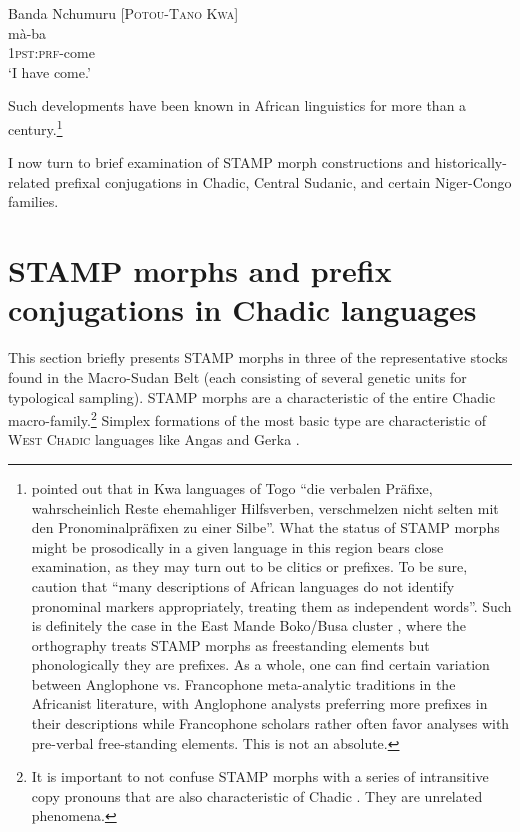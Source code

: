 \documentclass[output=paper]{langsci/langscibook}
\begin{document}
\ea\label{ex:anderson:40}
Banda Nchumuru \citep[Nuchumuru 4]{Cleal1973}      [\textsc{Potou-Tano} K\textsc{wa}]\\
\gll mà-ba\\
\textsc{1pst}:\textsc{prf}-come\\
\glt `I have come.'
\z

Such developments have been known in African linguistics for more than a century.\footnote{\citet[211]{Seidel1898} pointed out that in Kwa languages of Togo ``die verbalen Präfixe, wahrscheinlich Reste ehemahliger Hilfsverben, verschmelzen nicht selten mit den Pronominalpräfixen zu einer Silbe''. What the status of STAMP morphs might be prosodically in a given language in this region bears close examination, as they may turn out to be clitics or prefixes. To be sure, \citet[93]{CreisselsEtAl2008} caution that ``many descriptions of African languages do not identify pronominal markers appropriately, treating them as independent words''. Such is definitely the case in the East Mande Boko/Busa cluster \citep{Jones1998}, where the orthography treats STAMP morphs as freestanding elements but phonologically they are prefixes. As a whole, one can find certain variation between Anglophone vs. Francophone meta-analytic traditions in the Africanist literature, with Anglophone analysts preferring more prefixes in their descriptions while Francophone scholars rather often favor analyses with pre-verbal free-standing elements. This is not an absolute.} 

I now turn to brief examination of STAMP morph constructions and historically-related prefixal conjugations in Chadic, Central Sudanic, and certain Niger-Congo families.

\section{STAMP morphs and prefix conjugations in Chadic languages}\label{sec:Anderson:7}

This section briefly presents STAMP morphs in three of the representative stocks found in the Macro-Sudan Belt (each consisting of several genetic units for typological sampling). STAMP morphs are a characteristic of the entire Chadic macro-family.\footnote{It is important to not confuse STAMP morphs with a series of intransitive copy pronouns that are also characteristic of Chadic \citep{Frajzyngier1977, Burquest1986}. They are unrelated phenomena.} Simplex formations of the most basic type  are characteristic of \textsc{West Chadic} languages like Angas  and Gerka .
\end{document}
